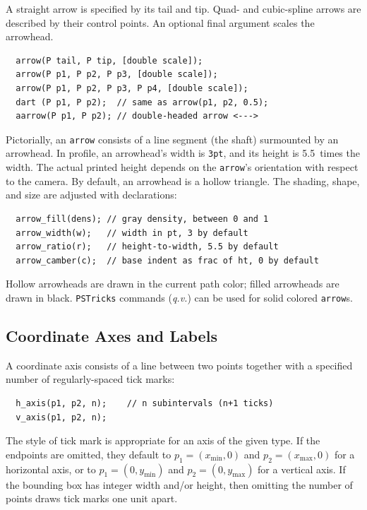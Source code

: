 \documentclass[12pt]{report}
\newcommand{\code}[1]{\texttt{#1}}
\begin{document}
 A straight arrow is specified by its tail and
tip. Quad- and cubic-spline arrows are described by their control
points. An optional final argument scales the arrowhead.
\begin{verbatim}
  arrow(P tail, P tip, [double scale]);
  arrow(P p1, P p2, P p3, [double scale]);
  arrow(P p1, P p2, P p3, P p4, [double scale]);
  dart (P p1, P p2);  // same as arrow(p1, p2, 0.5);
  aarrow(P p1, P p2); // double-headed arrow <--->
\end{verbatim}

Pictorially, an \code{arrow} consists of a line segment (the shaft)
surmounted by an arrowhead. In profile, an arrowhead's width is
\code{3pt}, and its height is 5.5~times the width.  The actual printed
height depends on the \code{arrow}'s orientation with respect to the
camera.  By default, an arrowhead is a hollow triangle. The shading,
shape, and size are adjusted with declarations:
\begin{verbatim}
  arrow_fill(dens); // gray density, between 0 and 1
  arrow_width(w);   // width in pt, 3 by default
  arrow_ratio(r);   // height-to-width, 5.5 by default
  arrow_camber(c);  // base indent as frac of ht, 0 by default
\end{verbatim}
\begin{center}
   \qquad
   \qquad
  
\end{center}

Hollow arrowheads are drawn in the current path color; filled
arrowheads are drawn in black. \code{PSTricks}
commands (\emph{q.v.}) can be used for solid colored \code{arrow}s.


\subsection*{Coordinate Axes and Labels} 

A coordinate axis consists of a line between two points together with
a specified number of regularly-spaced tick marks:
\begin{verbatim}
  h_axis(p1, p2, n);    // n subintervals (n+1 ticks)
  v_axis(p1, p2, n);
\end{verbatim}
The style of tick mark is appropriate for an axis of the given type.
If the endpoints are omitted, they default to $p_1=(x_\mathrm{min},0)$
and $p_2=(x_\mathrm{max},0)$ for a horizontal axis, or to
$p_1=(0,y_\mathrm{min})$ and $p_2=(0,y_\mathrm{max})$ for a vertical
axis. If the bounding box has integer width and/or
height, then omitting the number of points draws tick marks one unit
apart.
\end{document}
